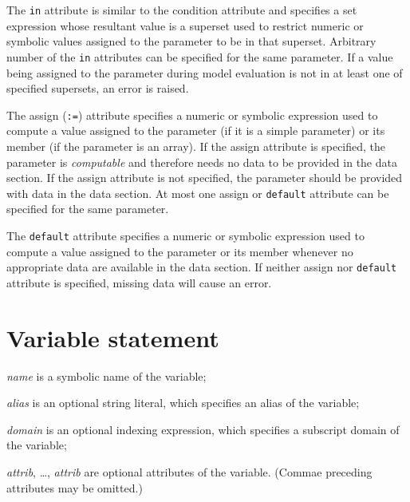 \documentclass[11pt]{report}
\def\para#1{\noindent{\bf#1}}
\begin{document}
The {\tt in} attribute is similar to the condition attribute and
specifies a set expression whose resultant value is a superset used to
restrict numeric or symbolic values assigned to the parameter to be in
that superset. Arbitrary number of the {\tt in} attributes can be
specified for the same parameter. If a value being assigned to the
parameter during model evaluation is not in at least one of specified
supersets, an error is raised.

The assign ({\tt:=}) attribute specifies a numeric or symbolic
expression used to compute a value assigned to the parameter (if it is
a simple parameter) or its member (if the parameter is an array). If
the assign attribute is specified, the parameter is {\it computable}
and therefore needs no data to be provided in the data section. If the
assign attribute is not specified, the parameter should be provided
with data in the data section. At most one assign or {\tt default}
attribute can be specified for the same parameter.

The {\tt default} attribute specifies a numeric or symbolic expression
used to compute a value assigned to the parameter or its member
whenever no appropriate data are available in the data section. If
neither assign nor {\tt default} attribute is specified, missing data
will cause an error.

\newpage

\section{Variable statement}

\noindent
{}

\medskip

\noindent
{\it name} is a symbolic name of the variable;

\noindent
{\it alias} is an optional string literal, which specifies an alias of
the variable;

\noindent
{\it domain} is an optional indexing expression, which specifies
a subscript domain of the variable;

\noindent
{\it attrib}, \dots, {\it attrib} are optional attributes of the
variable. (Commae preceding attributes may be omitted.)

\para{Optional attributes}
\end{document}
